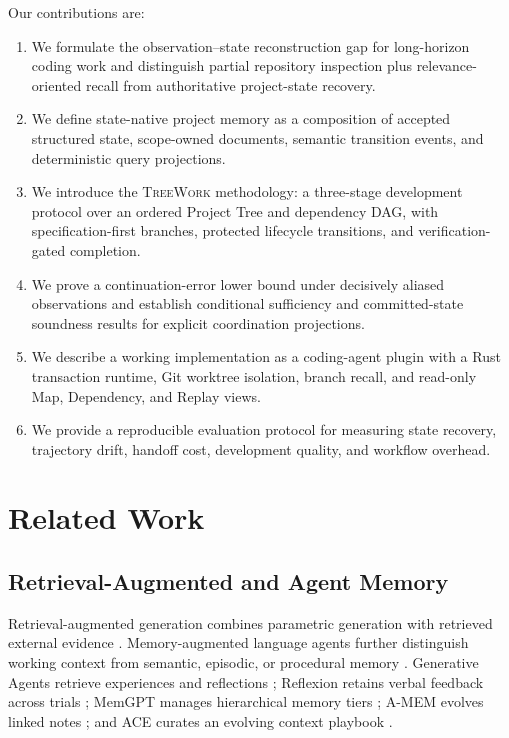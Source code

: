\documentclass[11pt]{article}
\newcommand{\system}{\textsc{TreeWork}\xspace}
\theoremstyle{definition}
\begin{document}
Our contributions are:

\begin{enumerate}
  \item We formulate the observation--state reconstruction gap for
        long-horizon coding work and distinguish partial repository inspection
        plus relevance-oriented recall from authoritative project-state
        recovery.
  \item We define state-native project memory as a composition of accepted
        structured state, scope-owned documents, semantic transition events,
        and deterministic query projections.
  \item We introduce the \system methodology: a three-stage development
        protocol over an ordered Project Tree and dependency DAG, with
        specification-first branches, protected lifecycle transitions, and
        verification-gated completion.
  \item We prove a continuation-error lower bound under decisively aliased
        observations and establish conditional sufficiency and committed-state
        soundness results for explicit coordination projections.
  \item We describe a working implementation as a coding-agent plugin with a
        Rust transaction runtime, Git worktree isolation, branch recall, and
        read-only Map, Dependency, and Replay views.
  \item We provide a reproducible evaluation protocol for measuring state
        recovery, trajectory drift, handoff cost, development quality, and
        workflow overhead.
\end{enumerate}

\section{Related Work}

\subsection{Retrieval-Augmented and Agent Memory}

Retrieval-augmented generation combines parametric generation with retrieved
external evidence \citep{lewis2020rag}.  Memory-augmented language agents further
distinguish working context from semantic, episodic, or procedural memory
\citep{sumers2023coala,du2026memory}.  Generative Agents retrieve experiences
and reflections \citep{park2023generative}; Reflexion retains verbal feedback
across trials \citep{shinn2023reflexion}; MemGPT manages hierarchical memory
tiers \citep{packer2023memgpt}; A-MEM evolves linked notes
\citep{xu2025amem}; and ACE curates an evolving context playbook
\citep{zhang2025ace}.
\end{document}
